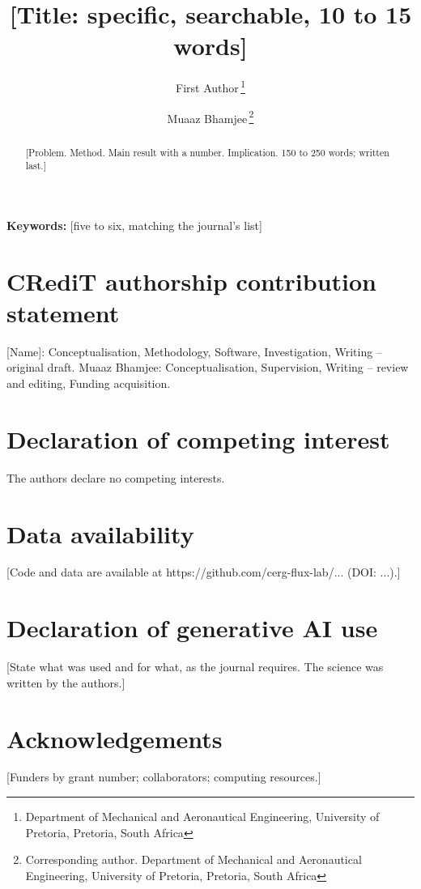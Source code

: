 \documentclass[11pt,a4paper]{article}
\title{[Title: specific, searchable, 10 to 15 words]}
\author{First Author\,\orcidlink{0000-0000-0000-0000}\thanks{Department of Mechanical and Aeronautical Engineering, University of Pretoria, Pretoria, South Africa}
\and Muaaz Bhamjee\,\orcidlink{0000-0002-2697-4589}\thanks{Corresponding author. Department of Mechanical and Aeronautical Engineering, University of Pretoria, Pretoria, South Africa}}
\begin{document}
\maketitle
\linenumbers

\begin{abstract}
[Problem. Method. Main result with a number. Implication. 150 to 250 words; written last.]
\end{abstract}

\noindent\textbf{Keywords:} [five to six, matching the journal's list]






\section*{CRediT authorship contribution statement}
[Name]: Conceptualisation, Methodology, Software, Investigation, Writing -- original draft.
Muaaz Bhamjee: Conceptualisation, Supervision, Writing -- review and editing, Funding acquisition.

\section*{Declaration of competing interest}
The authors declare no competing interests.

\section*{Data availability}
[Code and data are available at https://github.com/cerg-flux-lab/... (DOI: ...).]

\section*{Declaration of generative AI use}
[State what was used and for what, as the journal requires. The science was written by the authors.]

\section*{Acknowledgements}
[Funders by grant number; collaborators; computing resources.]



\end{document}

